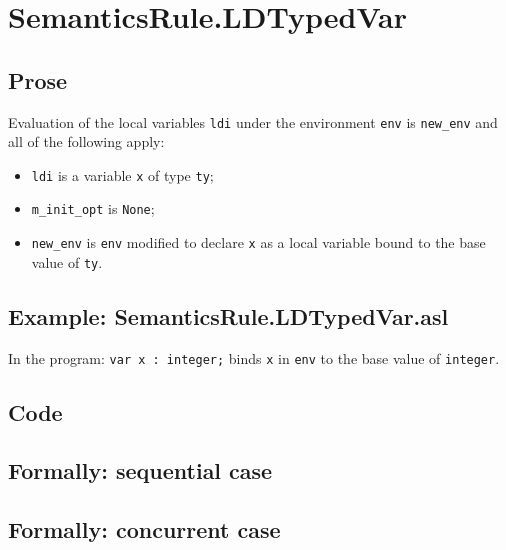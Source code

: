 \documentclass{book}
\begin{document}

\section{SemanticsRule.LDTypedVar \label{sec:SemanticsRule.LDTypedVar}}

    \subsection{Prose}
Evaluation of the local variables \texttt{ldi} under the environment
\texttt{env} is \texttt{new\_env} and all of the following apply:
    \begin{itemize}
    \item \texttt{ldi} is a variable \texttt{x} of type \texttt{ty};
    \item \texttt{m\_init\_opt} is \texttt{None};
    \item \texttt{new\_env} is \texttt{env} modified to declare \texttt{x} as a local variable bound to
      the base value of \texttt{ty}.
    \end{itemize}

    \subsection{Example: SemanticsRule.LDTypedVar.asl}
    In the program:
    \texttt{var x : integer;} binds \texttt{x} in \texttt{env} to the base value of \texttt{integer}.

  \subsection{Code}

\begin{emptyformal}
  \subsection{Formally: sequential case}

  \subsection{Formally: concurrent case}
\end{emptyformal}
\end{document}
